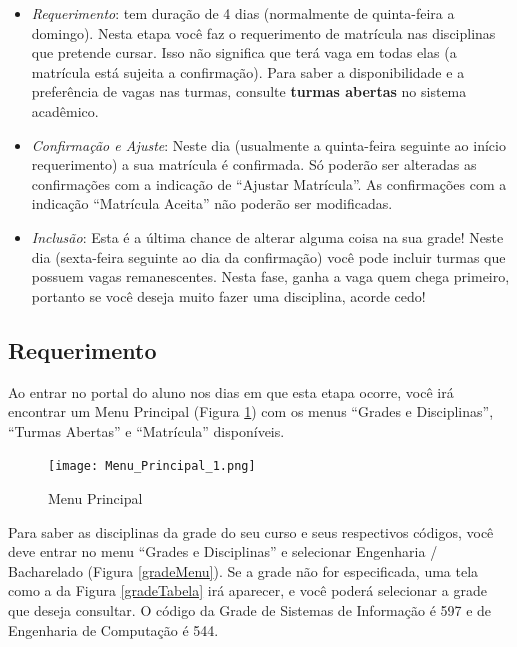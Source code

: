\documentclass[a4paper,12pt,openany]{article}
\begin{document}
\begin{itemize}
\item \textit{Requerimento}: tem duração de 4 dias (normalmente de quinta-feira a domingo). Nesta etapa você faz o requerimento de matrícula nas disciplinas que pretende cursar. Isso não significa que terá vaga em todas elas (a matrícula está sujeita a confirmação). Para saber a disponibilidade e a preferência de vagas nas turmas, consulte \textbf{turmas abertas} no sistema acadêmico.

\item \textit {Confirmação e Ajuste}: Neste dia (usualmente a quinta-feira seguinte ao início requerimento) a sua matrícula é confirmada. Só poderão ser alteradas as confirmações com a indicação de ``Ajustar Matrícula''. As confirmações com a indicação ``Matrícula Aceita'' não poderão ser modificadas.

\item \textit{Inclusão}: Esta é a última chance de alterar alguma coisa na sua grade! Neste dia (sexta-feira seguinte ao dia da confirmação) você pode incluir turmas que possuem vagas remanescentes. Nesta fase, ganha a vaga quem chega primeiro, portanto se você deseja muito fazer uma disciplina, acorde cedo!

\end{itemize}

\subsection{Requerimento}

Ao entrar no portal do aluno nos dias em que esta etapa ocorre, você irá encontrar um Menu Principal (Figura \ref{menuPrincipal}) com os menus ``Grades e Disciplinas'', ``Turmas Abertas'' e ``Matrícula'' disponíveis.

	\begin{figure}[ht!]  \centering
		\texttt{[image: Menu\_Principal\_1.png]}
		\caption{Menu Principal}
		\label{menuPrincipal}
	\end{figure}

Para saber as disciplinas da grade do seu curso e seus respectivos códigos, você deve entrar no menu ``Grades e Disciplinas'' e selecionar Engenharia / Bacharelado  (Figura  \ref{gradeMenu}). Se a grade não for especificada, uma tela como a da Figura  \ref{gradeTabela} irá aparecer, e você poderá selecionar a grade que deseja consultar. O código da Grade de Sistemas de Informação é 597 e de Engenharia de Computação é 544.
\end{document}
